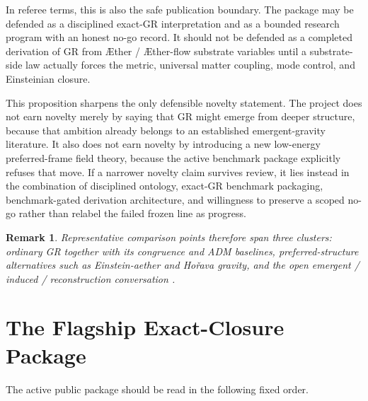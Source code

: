 \documentclass[11pt]{article}
\newcommand{\Aether}{\AE{}ther}
\newcommand{\Aflow}{\AE{}ther-flow}
\newtheorem{remark}{Remark}
\begin{document}
In referee terms, this is also the safe publication boundary. The package may be defended as a disciplined exact-GR interpretation and as a bounded research program with an honest no-go record. It should not be defended as a completed derivation of GR from \Aether{} / \Aflow{} substrate variables until a substrate-side law actually forces the metric, universal matter coupling, mode control, and Einsteinian closure.

This proposition sharpens the only defensible novelty statement. The project does not earn novelty merely by saying that GR might emerge from deeper structure, because that ambition already belongs to an established emergent-gravity literature. It also does not earn novelty by introducing a new low-energy preferred-frame field theory, because the active benchmark package explicitly refuses that move. If a narrower novelty claim survives review, it lies instead in the combination of disciplined ontology, exact-GR benchmark packaging, benchmark-gated derivation architecture, and willingness to preserve a scoped no-go rather than relabel the failed frozen line as progress.

\begin{remark}
Representative comparison points therefore span three clusters: ordinary GR together with its congruence and ADM baselines, preferred-structure alternatives such as Einstein-aether and Ho\v{r}ava gravity, and the open emergent / induced / reconstruction conversation \cite{Einstein1916,Raychaudhuri1955,EllisVanElst1999,ADM1962,JacobsonMattingly2001,JacobsonMattingly2004,ElingJacobson2004,Jacobson2010,Jacobson2014,JacobsonSperanza2015,Horava2009,Jacobson1995,Visser2002,HojmanKucharTeitelboim1976,Deser2004,Lovelock1971,BarceloLiberatiVisser2011,Sakharov1967}.
\end{remark}

\section{The Flagship Exact-Closure Package}

The active public package should be read in the following fixed order.
\end{document}

